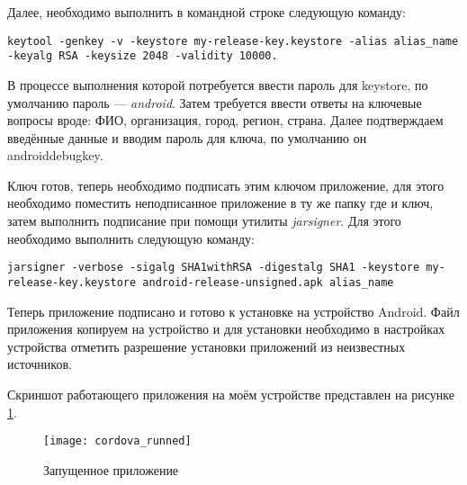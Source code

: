 Далее, необходимо выполнить в командной строке следующую команду: 
\begin{lstlisting}
keytool -genkey -v -keystore my-release-key.keystore -alias alias_name -keyalg RSA -keysize 2048 -validity 10000.
\end{lstlisting}

В процессе выполнения которой потребуется ввести пароль для keystore, по умолчанию пароль --- \textit{android}. Затем требуется ввести ответы на ключевые вопросы вроде: ФИО, организация, город, регион, страна. Далее подтверждаем введённые данные и вводим пароль для ключа, по умолчанию он androiddebugkey\cite{android:publish}.

Ключ готов, теперь необходимо подписать этим ключом приложение, для этого необходимо поместить неподписанное приложение в ту же папку где и ключ, затем выполнить подписание при помощи утилиты \textit{jarsigner}. Для этого необходимо выполнить следующую команду: 
\begin{lstlisting}
jarsigner -verbose -sigalg SHA1withRSA -digestalg SHA1 -keystore my-release-key.keystore android-release-unsigned.apk alias_name
\end{lstlisting}

Теперь приложение подписано и готово к установке на устройство Android. Файл приложения копируем на устройство и для установки необходимо в настройках устройства отметить разрешение установки приложений из неизвестных источников.

Скриншот работающего приложения на моём устройстве представлен на рисунке \ref{cordova_runned}.
\begin{figure}[ht]
\center\texttt{[image: cordova\_runned]}
\caption{Запущенное приложение}\label{cordova_runned}
\end{figure}
